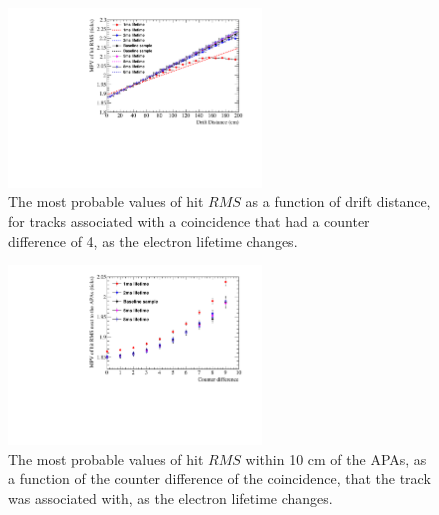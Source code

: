 \begin{figure}[h!]
  \centering
  \includegraphics[width=0.6\textwidth]{Canvas_CountDiff4_All_Positions_ElecLifetime}
  \caption[The drift distance dependence of diffusion in the 35 ton dataset and Monte Carlo for coincidences with a counter difference of 4, as the electron lifetime changes]
          {The most probable values of hit $RMS$ as a function of drift distance, for tracks associated with a coincidence that had a counter difference of 4, as the electron lifetime changes.}
  \label{fig:DiffLifeStudy_CDiff4}
\end{figure}

\begin{figure}[h!]
  \centering
  \includegraphics[width=0.6\textwidth]{Canvas_All_Angles_RMS0cm_ElecLifetime}
  \caption[The angular dependence of diffusion in the 35 ton dataset and Monte Carlo for hits within 10 cm of the APAs, as the electron lifetime changes]
          {The most probable values of hit $RMS$ within 10 cm of the APAs, as a function of the counter difference of the coincidence, that the track was associated with, as the electron lifetime changes.}
  \label{fig:DiffLifeStudy_RMS0cm}
\end{figure}


